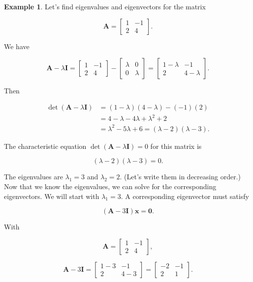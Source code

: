 \documentclass[
]{book}
\theoremstyle{definition}
\theoremstyle{definition}
\newtheorem{example}{Example}[chapter]
\theoremstyle{definition}
\theoremstyle{definition}
\theoremstyle{remark}
\begin{document}
\begin{examplebox}

\begin{example}
\protect\hypertarget{exm:fstev}{}\label{exm:fstev}Let's find eigenvalues and eigenvectors for the matrix

\[\mathbf{A}=\begin{bmatrix}1 & -1\\2 & 4\end{bmatrix}.\]

We have

\[\mathbf{A}-\lambda \mathbf{I}=\begin{bmatrix}1 & -1\\2 & 4\end{bmatrix}-\begin{bmatrix}\lambda & 0\\0 & \lambda\end{bmatrix}=\begin{bmatrix}1-\lambda & -1\\2 & 4-\lambda\end{bmatrix}.\]

Then

\begin{align*}
\det(\mathbf{A}-\lambda \mathbf{I})&=(1-\lambda)(4-\lambda)-(-1)(2) \\
&=4-\lambda-4\lambda+\lambda^2+2\\
&=\lambda^2-5\lambda+6=(\lambda-2)(\lambda-3).
\end{align*}

The characteristic equation \(\det(\mathbf{A}-\lambda \mathbf{I})=0\) for this matrix is

\[(\lambda-2)(\lambda-3)=0.\]

The eigenvalues are \(\lambda_1=3\) and \(\lambda_2=2\). (Let's write them in decreasing order.) Now that we know the eigenvalues, we can solve for the corresponding eigenvectors. We will start with \(\lambda_1=3\). A corresponding eigenvector must satisfy

\[(\mathbf{A}-3\mathbf{I})\mathbf{x}=\mathbf{0}.\]

With

\[\mathbf{A}=\begin{bmatrix}1 & -1\\2 & 4\end{bmatrix},\]

\[\mathbf{A}-3\mathbf{I}=\begin{bmatrix}1-3 & -1 \\2 & 4-3\end{bmatrix}=\begin{bmatrix}-2 & -1 \\2 & 1\end{bmatrix}.\]


\end{example}
\end{examplebox}
\end{document}
